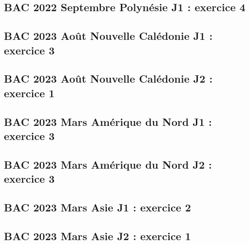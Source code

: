 \documentclass[lang=fr,edition=teacher,layout=sheet]{mxbook}
\begin{document}
\begingroup\endgroup
\par\bigskip
{}\subsection*{BAC 2022 Septembre Polynésie J1 : exercice 4}
\begingroup\endgroup
\par\bigskip
{}\subsection*{BAC 2023 Août Nouvelle Calédonie J1 : exercice 3}
\begingroup\endgroup
\par\bigskip
{}\subsection*{BAC 2023 Août Nouvelle Calédonie J2 : exercice 1}
\begingroup\endgroup
\par\bigskip
{}\subsection*{BAC 2023 Mars Amérique du Nord J1 : exercice 3}
\begingroup\endgroup
\par\bigskip
{}\subsection*{BAC 2023 Mars Amérique du Nord J2 : exercice 3}
\begingroup\endgroup
\par\bigskip
{}\subsection*{BAC 2023 Mars Asie J1 : exercice 2}
\begingroup\endgroup
\par\bigskip
{}\subsection*{BAC 2023 Mars Asie J2 : exercice 1}
\end{document}
